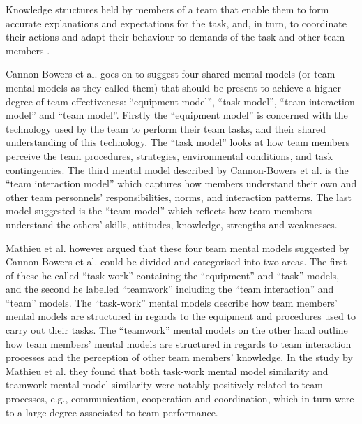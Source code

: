 \begin{fancyquotes}
Knowledge structures held by members of a team that enable them to form accurate explanations and expectations for the task, and, in turn, to coordinate their actions and adapt their behaviour to demands of the task and other team members \cite{Cannon1993}.
\end{fancyquotes}

Cannon-Bowers et al. \cite{Cannon1993} goes on to suggest four shared mental models (or team mental models as they called them) that should be present to achieve a higher degree of team effectiveness: ``equipment model'', ``task model'', ``team interaction model'' and ``team model''. Firstly the ``equipment model'' is concerned with the technology used by the team to perform their team tasks, and their shared understanding of this technology. The ``task model'' looks at how team members perceive the team procedures, strategies, environmental conditions, and task contingencies. The third mental model described by Cannon-Bowers et al. is the ``team interaction model'' which captures how members understand their own and other team personnels' responsibilities, norms, and interaction patterns. The last model suggested is the ``team model'' which reflects how team members understand the others' skills, attitudes, knowledge, strengths and weaknesses.

Mathieu et al. \cite{Mathieu2000} however argued that these four team mental models suggested by Cannon-Bowers et al. \cite{Cannon1993} could be divided and categorised into two areas. The first of these he called ``task-work'' containing the ``equipment'' and ``task'' models, and the second he labelled ``teamwork'' including the ``team interaction'' and ``team'' models. The ``task-work'' mental models describe how team members' mental models are structured in regards to the equipment and procedures used to carry out their tasks. The ``teamwork'' mental models on the other hand outline how team members' mental models are structured in regards to team interaction processes and the perception of other team members' knowledge. In the study by Mathieu et al. they found that both task-work mental model similarity and teamwork mental model similarity were notably positively related to team processes, e.g., communication, cooperation and coordination, which in turn were to a large degree associated to team performance.

